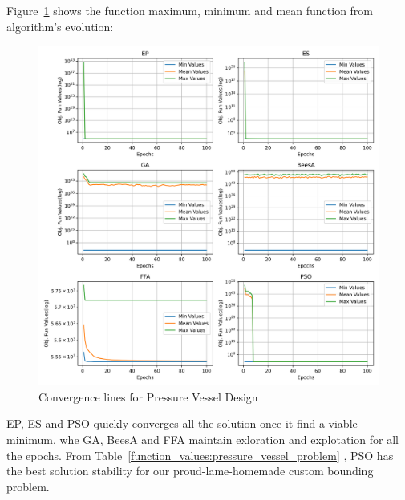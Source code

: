 
Figure~\ref{fig:pressure_vessel_problem_convergence} shows the
function maximum, minimum and mean function from algorithm's evolution:

\begin{figure}[H]
\centering
\caption{Convergence lines for Pressure Vessel Design}
\label{fig:pressure_vessel_problem_convergence}
\includegraphics[width=0.4 \textwidth]{images/pressure_vessel_problem_convergence.png}
\end{figure}

EP, ES and PSO quickly converges all the solution once it find a viable minimum, whe GA, BeesA and FFA
maintain exloration and explotation for all the epochs. From Table~\ref{function_values:pressure_vessel_problem}
, PSO has the best solution stability for our proud-lame-homemade custom bounding problem.